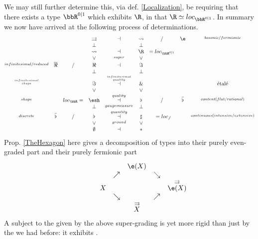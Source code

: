 \documentclass[12pt,titlepage]{article}
\newcommand{\itexarray}[1]{\begin{matrix}#1\end{matrix}}
\theoremstyle{plain}
\theoremstyle{definition}
\theoremstyle{remark}
\begin{document}
We may still further determine this, via def. \ref{Localization}, be requiring that there exists a type $\bbR^{0|1}$ which exhibits $\R$, in that $\R \simeq loc_{\bbR^{0|1}}$.
In summary we now have arrived at the following process of determinations.
\begin{displaymath}
\itexarray{
&& & \rightrightarrows &\dashv& \rightsquigarrow & / & \e & \stackrel{bosonic/fermionic}{}
\\
&& & \bot && \bot
\\
&&  & \rightsquigarrow &\dashv& \R & = loc_{\bbR^{0|1}}
\\
&& & \vee &\stackrel{super}{}& \vee
\\
\stackrel{infinitesimal/reduced}{} &\overline{\Re} & / & \Re &\stackrel{}{\dashv}& \Im &  &  &
\\
&& & \bot && \bot
\\
\stackrel{infinitesimal \atop shape}{} && & \Im &\stackrel{infinitesimal \atop quality}{\dashv}& \& & && \text{étalé}
\\
&& & \vee && \vee
\\
\stackrel{shape}{} && loc_{\bbR} =& \esh  &\stackrel{quality}{\dashv}& \flat & / & \overline{\flat}&  \stackrel{content(flat/rational)}{}
\\
&& & \bot &\stackrel{gaugemeasure}{}& \bot
\\
\stackrel{discrete}{} & \overline{\flat} & / & \flat &\stackrel{quantity}{\dashv}& \sharp & = loc_{\not\not}  &   & \stackrel{continuous (intensive/extensive)}{}
\\
&& & \vee &\stackrel{ground}{}& \vee
\\
&& & \emptyset &\dashv& \ast &
}
\end{displaymath}
Prop. \ref{TheHexagon} here gives a decomposition of types into their purely even-graded part and their purely fermionic part
\begin{displaymath}
\itexarray{
&&   &&  && \stackrel{}{\e(X)}
\\
& & &  & & \nearrow_{} && \searrow
\\
&& && X && &&
\stackrel{\rightrightarrows}{\e(X)}
\\
&  &  &  & & \searrow && \nearrow_{}
\\
&&  &&  && \stackrel{\rightrightarrows}{X}
}
\end{displaymath}
A  subject to the  given by the above super-grading is yet more rigid than just by the  we had before: it exhibits .
\end{document}
